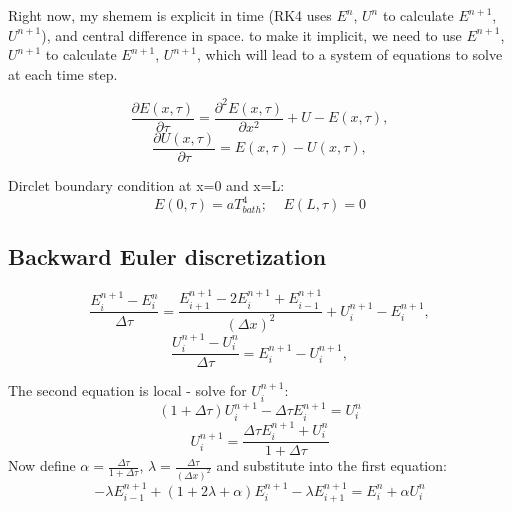 \documentclass{article}
\begin{document}
Right now, my shemem is explicit in time (RK4 uses $E^n$, $U^n$ to calculate $E^{n+1}$, $U^{n+1}$), and central difference in space.
to make it implicit, we need to use $E^{n+1}$, $U^{n+1}$ to calculate $E^{n+1}$, $U^{n+1}$, 
which will lead to a system of equations to solve at each time step.

\begin{equation}
\frac{\partial E(x,\tau)}{\partial \tau} = \frac{\partial^2E(x,\tau)}{\partial x^2} + U - E(x,\tau),
\end{equation}
\begin{equation}
\frac{\partial U(x,\tau)}{\partial \tau} = E(x,\tau) - U(x,\tau),
\end{equation}

Dirclet boundary condition at x=0 and x=L:
\begin{equation}
E(0,\tau) = aT_{bath}^4; \;\;\;\;E(L,\tau) = 0
\end{equation}

\subsection*{Backward Euler discretization}
\begin{equation}
\frac{E_i^{n+1} - E_i^n}{\Delta \tau} = \frac{E_{i+1}^{n+1} - 2E_i^{n+1} + E_{i-1}^{n+1}}{(\Delta x)^2} + U_i^{n+1} - E_i^{n+1},
\end{equation}
\begin{equation}
\frac{U_i^{n+1} - U_i^n}{\Delta \tau} = E_i^{n+1} - U_i^{n+1},
\end{equation}

The second equation is local - solve for $U_i^{n+1}$:
\begin{equation}
    (1+\Delta \tau) U_i^{n+1} - \Delta \tau E_i^{n+1} = U_i^n
\end{equation}
\begin{equation}
    U_i^{n+1} = \frac{\Delta \tau E_i^{n+1} + U_i^n}{1+\Delta \tau}
\end{equation}
Now define $\alpha = \frac{\Delta \tau}{1+\Delta \tau}$, $\lambda = \frac{\Delta \tau}{(\Delta x)^2}$ and substitute into the first equation:
\begin{equation}
    -\lambda E_{i-1}^{n+1} + (1 + 2\lambda + \alpha) E_i^{n+1} - \lambda E_{i+1}^{n+1} = E_i^n + \alpha U_i^n
\end{equation}
\end{document}
